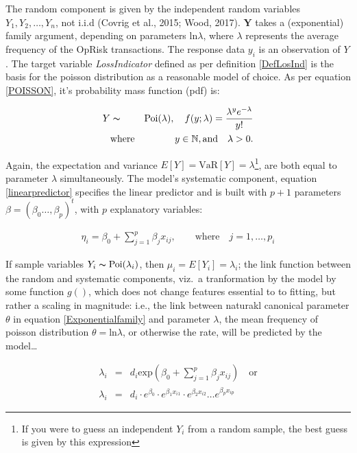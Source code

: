 \documentclass{DissertateUSU}
\begin{document}
The random component is given by the independent random variables
\(Y_1, Y_2,\ldots, Y_n\), not i.i.d (Covrig et al., 2015; Wood, 2017).
\(\mathbf{Y}\) takes a (exponential) family argument, depending on
parameters \(\mbox{ln}\lambda\), where \(\lambda\) represents the
average frequency of the OpRisk transactions. The response data \(y_i\)
is an observation of \(Y\). The target variable \emph{LossIndicator}
defined as per definition \ref{DefLosInd} is the basis for the poisson
distribution as a reasonable model of choice. As per equation
\ref{POISSON}, it's probability mass function (pdf) is:

\singlespacing

\begin{eqnarray}\label{eqn:Poisson}
Y &\thicksim & \mbox{Poi}(\lambda), \quad f(y;\lambda) = \frac{\lambda^y e^{-\lambda}}{y!}\\
 &\mbox{where}& \quad y \in  \mathbb{N}, \mbox{and} \quad \lambda > 0. \nonumber
\end{eqnarray} \doublespacing

Again, the expectation and variance
\(E[Y] = \mbox{VaR}[Y] = \lambda\)\footnote{If you were to guess an independent $Y_i$ from a random sample, the best guess is given by this expression},
are both equal to parameter \(\lambda\) simultaneously. The model's
systematic component, equation \ref{linearpredictor} specifies the
linear predictor and is built with \(p + 1\) parameters
\(\beta = (\beta_0\ldots,\beta_p)^t\), with \(p\) explanatory variables:

\singlespacing

\begin{eqnarray}
\eta_i = \beta_0 + \sum_{j=1}^{p}\beta_jx_{ij}, \qquad \mbox{where} \quad j = 1,\ldots,p_i
\end{eqnarray} \doublespacing

If sample variables \(Y_i \thicksim \mbox{Poi}(\lambda_i)\), then
\(\mu_i = E[Y_i] = \lambda_i\); the link function between the random and
systematic components, viz.~a tranformation by the model by some
function \(g()\), which does not change features essential to to
fitting, but rather a scaling in magnitude: i.e., the link between
naturakl canonical parameter \(\theta\) in equation
\ref{Exponentialfamily} and parameter \(\lambda\), the mean frequency of
poisson distribution \(\theta = \mbox{ln}\lambda\), or otherwise the
rate, will be predicted by the model\ldots

\singlespacing

\begin{eqnarray}\label{eqn:multmodel}
\lambda_i &=& d_i\mbox{exp}(\beta_0 + \sum_{j=1}^{p}\beta_jx_{ij}) \quad \mbox{or} \nonumber \\
\lambda_i &=& d_i\cdot e^{\beta_0}\cdot e^{\beta_1x_{i1}}\cdot e^{\beta_2x_{i2}} \ldots e^{\beta_px_{ip}}
\end{eqnarray} \doublespacing
\end{document}
